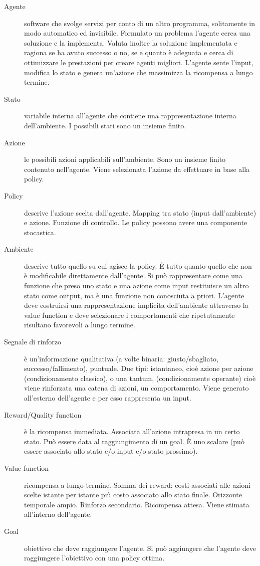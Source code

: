 \documentclass[\main/main.tex]{subfiles}
\begin{document}
\begin{description}
  \item [Agente] software che svolge servizi per conto di un altro programma, solitamente in modo automatico ed invisibile. Formulato un problema l’agente cerca una soluzione e la implementa. Valuta inoltre la soluzione implementata e ragiona se ha avuto successo o no, se e quanto è adeguata e cerca di ottimizzare le prestazioni per creare agenti migliori. L'agente sente l'input, modifica lo stato e genera un'azione che massimizza la ricompensa a lungo termine.
  \item [Stato] variabile interna all’agente che contiene una rappresentazione interna dell’ambiente. I possibili stati sono un insieme finito.
  \item [Azione] le possibili azioni applicabili sull’ambiente. Sono un insieme finito contenuto nell’agente. Viene selezionata l’azione da effettuare in base alla policy.
  \item [Policy] descrive l’azione scelta dall’agente. Mapping tra stato (input dall’ambiente) e azione. Funzione di controllo. Le policy possono avere una componente stocastica.
  \item [Ambiente] descrive tutto quello su cui agisce la policy. È tutto quanto quello che non è modificabile direttamente dall’agente. Si può rappresentare come una funzione che preso uno stato e una azione come input restituisce un altro stato come output, ma è una funzione non conosciuta a priori. L’agente deve costruirsi una rappresentazione implicita dell’ambiente attraverso la value function e deve selezionare i comportamenti che ripetutamente risultano favorevoli a lungo termine.
  \item [Segnale di rinforzo] è un’informazione qualitativa (a volte binaria: giusto/sbagliato, successo/fallimento), puntuale. Due tipi: istantaneo, cioè azione per azione (condizionamento classico), o una tantum, (condizionamente operante) cioè viene rinforzata una catena di azioni, un comportamento. Viene generato all’esterno dell’agente e per esso rappresenta un input.
  \item [Reward/Quality function] è la ricompensa immediata. Associata all’azione intrapresa in un certo stato. Può essere data al raggiungimento di un goal. È uno scalare (può essere associato allo stato e/o input e/o stato prossimo).
  \item [Value function] ricompensa a lungo termine. Somma dei reward: costi associati alle azioni scelte istante per istante più costo associato allo stato finale. Orizzonte temporale ampio. Rinforzo secondario. Ricompensa attesa. Viene stimata all’interno dell’agente.
  \item [Goal] obiettivo che deve raggiungere l’agente. Si può aggiungere che l’agente deve raggiungere l’obiettivo con una policy ottima.
\end{description}
\end{document}
